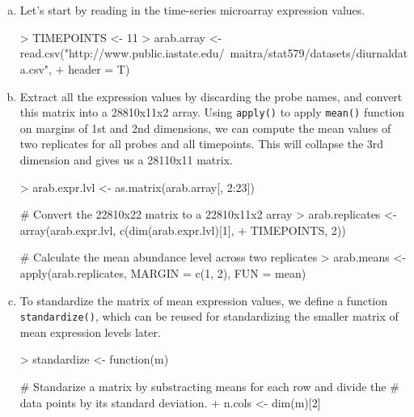\documentclass{article}
\begin{document}
    \section{}
    \begin{enumerate}[(a)]
    \item
    Let's start by reading in the time-series microarray expression values.
\begin{Schunk}
\begin{Sinput}
> TIMEPOINTS <- 11
> arab.array <- read.csv("http://www.public.iastate.edu/~maitra/stat579/datasets/diurnaldata.csv", 
+     header = T)
\end{Sinput}
\end{Schunk}
    \item
    Extract all the expression values by discarding the probe names, and
    convert this matrix into a 28810x11x2 array. Using \verb=apply()=
    to apply \verb=mean()= function on margins of 1st and 2nd
    dimensions, we can compute the mean values of two replicates for all probes and all timepoints. This will collapse the 3rd dimension and gives us a 28110x11 matrix.
\begin{Schunk}
\begin{Sinput}
> arab.expr.lvl <- as.matrix(arab.array[, 2:23])

# Convert the 22810x22 matrix to a 22810x11x2 array 
> arab.replicates <- array(arab.expr.lvl, c(dim(arab.expr.lvl)[1], 
+     TIMEPOINTS, 2))

# Calculate the mean abundance level across two replicates
> arab.means <- apply(arab.replicates, MARGIN = c(1, 2), FUN = mean)
\end{Sinput}
\end{Schunk}
    \item 
    \begin{inparaenum}
        \item[(d)]
        \item[(e)]
    \end{inparaenum}

    To standardize the matrix of mean expression values, we define a function \verb=standardize()=, which can be reused for standardizing the smaller matrix of mean expression levels later.
\begin{Schunk}
\begin{Sinput}
> standardize <- function(m) {
    # Standarize a matrix by substracting means for each row and divide the
    # data points by its standard deviation.
+     n.cols <- dim(m)[2]

}
\end{Sinput}
\end{Schunk}
\end{enumerate}
\end{document}
